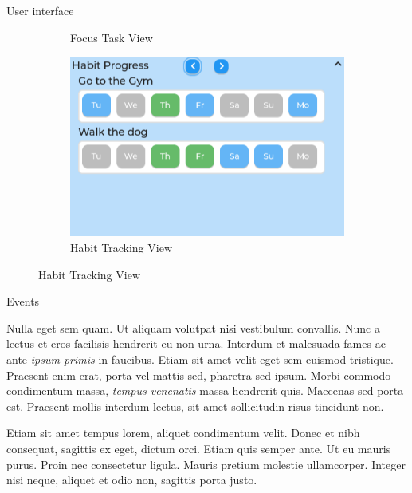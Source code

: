 \documentclass[final]{beamer}
\newlength{\colwidth}
\begin{document}
\begin{frame}[t]
\begin{columns}[t]
\begin{column}{\colwidth}
\begin{block}{User interface}
\begin{figure}
\begin{subfigure}[t]{0.49\textwidth}
            \caption{Focus Task View}
        \end{subfigure}
        \begin{subfigure}[t]{0.49\textwidth}
            \includegraphics[width=\textwidth]{habitTile.png}
            \caption{Habit Tracking View}
        \end{subfigure}

    \end{figure} 
  \end{block}

  \begin{block}{Events}

    Nulla eget sem quam. Ut aliquam volutpat nisi vestibulum convallis. Nunc a
    lectus et eros facilisis hendrerit eu non urna. Interdum et malesuada fames
    ac ante \textit{ipsum primis} in faucibus. Etiam sit amet velit eget sem
    euismod tristique. Praesent enim erat, porta vel mattis sed, pharetra sed
    ipsum. Morbi commodo condimentum massa, \textit{tempus venenatis} massa
    hendrerit quis. Maecenas sed porta est. Praesent mollis interdum lectus,
    sit amet sollicitudin risus tincidunt non.

    Etiam sit amet tempus lorem, aliquet condimentum velit. Donec et nibh
    consequat, sagittis ex eget, dictum orci. Etiam quis semper ante. Ut eu
    mauris purus. Proin nec consectetur ligula. Mauris pretium molestie
    ullamcorper. Integer nisi neque, aliquet et odio non, sagittis porta justo.


\end{block}
\end{column}
\end{columns}
\end{frame}
\end{document}

